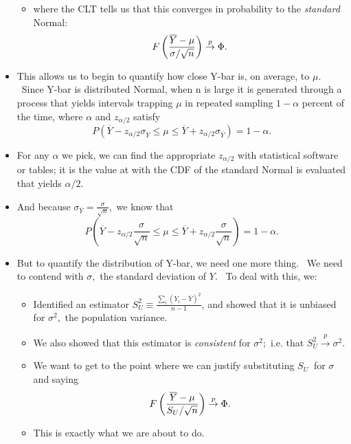 \documentclass[11pt]{article}
\begin{document}
\begin{itemize}
\begin{itemize}
\item where the CLT tells us that this converges in probability to the 
\textit{standard }Normal:%
\begin{equation*}
F\left( \frac{\overline{Y}-\mu }{\sigma /\sqrt{n}}\right) \overset{p}{%
\rightarrow }\Phi .
\end{equation*}
\end{itemize}

\item This allows us to begin to quantify how close Y-bar is, on average, to 
$\mu .$ \ Since Y-bar is distributed Normal, when n is large it is generated
through a process that yields intervals trapping $\mu $ in repeated sampling 
$1-\alpha $ percent of the time, where $\alpha $ and $z_{\alpha /2}$ satisfy%
\begin{equation*}
P(\overline{Y}-z_{\alpha /2}\sigma _{\overline{Y}}\leq \mu \leq \overline{Y}%
+z_{\alpha /2}\sigma _{\overline{Y}})=1-\alpha .
\end{equation*}

\item For any $\alpha $ we pick, we can find the appropriate $z_{\alpha /2}$
with statistical software or tables; it is the value at with the CDF of the
standard Normal is evaluated that yields $\alpha /2.$

\item And because $\sigma _{\overline{Y}}=\frac{\sigma }{\sqrt{n}},$ we know
that%
\begin{equation*}
P(\overline{Y}-z_{\alpha /2}\frac{\sigma }{\sqrt{n}}\leq \mu \leq \overline{Y%
}+z_{\alpha /2}\frac{\sigma }{\sqrt{n}})=1-\alpha .
\end{equation*}

\item But to quantify the distribution of Y-bar, we need one more thing. \
We need to contend with $\sigma ,$ the standard deviation of $Y$. \ To deal
with this, we:

\begin{itemize}
\item Identified an estimator $S_{U}^{2}\equiv \frac{\sum\nolimits_{i}\left(
Y_{i}-\overline{Y}\right) ^{2}}{n-1}$, and showed that it is unbiased for $%
\sigma ^{2},$ the population variance.

\item We also showed that this estimator is \textit{consistent }for $\sigma
^{2};$ i.e. that $S_{U}^{2}\overset{p}{\rightarrow }\sigma ^{2}.$

\item We want to get to the point where we can justify substituting $S_{U}\ $%
for $\sigma $ and saying%
\begin{equation*}
F\left( \frac{\overline{Y}-\mu }{S_{U}/\sqrt{n}}\right) \overset{p}{%
\rightarrow }\Phi .
\end{equation*}

\item This is exactly what we are about to do.
\end{itemize}
\end{itemize}
\end{document}

